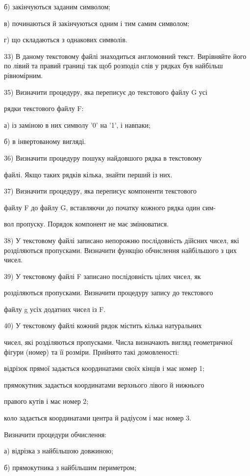 \documentclass[]{article}
\begin{document}
б) закінчуються заданим символом;

в) починаються й закінчуються одним і тим самим символом;

г) що складаються з однакових символів.

33) В даному текстовому файлі знаходиться англомовний текст. Вирівняйте
його по лівий та правий границі так щоб розподіл слів у рядках був
найбільш рівномірним.

35) Визначити процедуру, яка переписує до текстового файлу G усі

рядки текстового файлу F:

а) із заміною в них символу '0' на '1', і навпаки;

б) в інвертованому вигляді.

36) Визначити процедуру пошуку найдовшого рядка в текстовому

файлі. Якщо таких рядків кілька, знайти перший із них.

37) Визначити процедуру, яка переписує компоненти текстового

файлу F до файлу G, вставляючи до початку кожного рядка один сим-

вол пропуску. Порядок компонент не має змінюватися.

38) У текстовому файлі записано непорожню послідовність дійсних чисел,
які розділяються пропусками. Визначити функцію обчислення найбільшого з
цих чисел.

39) У текстовому файлі F записано послідовність цілих чисел, як

розділяються пропусками. Визначити процедуру запису до текстового

файлу g усіх додатних чисел із F.

40) У текстовому файлі кожний рядок містить кілька натуральних

чисел, які розділяються пропусками. Числа визначають вигляд геометричної
фігури (номер) та її розміри. Прийнято такі домовленості:

відрізок прямої задається координатами своїх кінців і має номер 1;

прямокутник задається координатами верхнього лівого й нижнього

правого кутів і має номер 2;

коло задається координатами центра й радіусом і має номер 3.

Визначити процедури обчислення:

а) відрізка з найбільшою довжиною;

б) прямокутника з найбільшим периметром;
\end{document}
